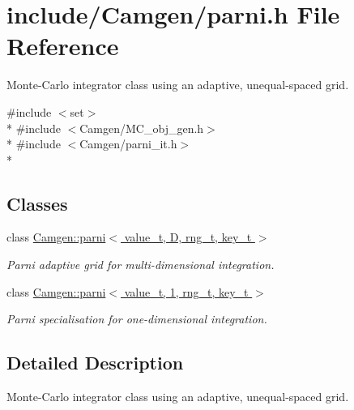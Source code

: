 \hypertarget{a00682}{\section{include/\-Camgen/parni.h File Reference}
\label{a00682}
}


Monte-\/\-Carlo integrator class using an adaptive, unequal-\/spaced grid.  


{\ttfamily \#include $<$set$>$}\\*
{\ttfamily \#include $<$Camgen/\-M\-C\-\_\-obj\-\_\-gen.\-h$>$}\\*
{\ttfamily \#include $<$Camgen/parni\-\_\-it.\-h$>$}\\*
\subsection*{Classes}
\begin{DoxyCompactItemize}
\item 
class \hyperlink{a00384}{Camgen\-::parni$<$ value\-\_\-t, D, rng\-\_\-t, key\-\_\-t $>$}
\begin{DoxyCompactList}\small\item\em Parni adaptive grid for multi-\/dimensional integration. \end{DoxyCompactList}\item 
class \hyperlink{a00385}{Camgen\-::parni$<$ value\-\_\-t, 1, rng\-\_\-t, key\-\_\-t $>$}
\begin{DoxyCompactList}\small\item\em Parni specialisation for one-\/dimensional integration. \end{DoxyCompactList}\end{DoxyCompactItemize}


\subsection{Detailed Description}
Monte-\/\-Carlo integrator class using an adaptive, unequal-\/spaced grid. 